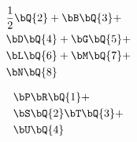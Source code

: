 \begin{equation}
    \begin{split}
        & \frac{1}{2}\bQ{2} + \bB\bQ{3} + \\
        & \bD\bQ{4} + \bG\bQ{5} + \\
        & \bL\bQ{6} + \bM\bQ{7} + \\
        & \bN\bQ{8}
    \end{split}
\end{equation}



 
\begin{equation}
    \begin{split}
        & \bP \bR\bQ{1} + \\
        & \bS\bQ{2}  \bT\bQ{3} + \\
        & \bU\bQ{4}
    \end{split}
\end{equation}
\fi
